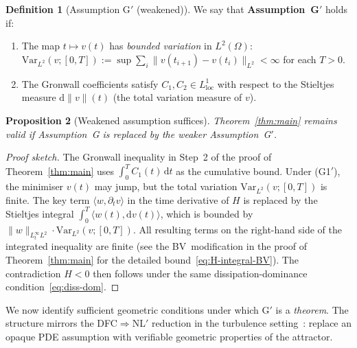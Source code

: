 \documentclass[12pt,a4paper]{article}
\theoremstyle{definition}
\newtheorem{definition}{Definition}[section]
\theoremstyle{plain}
\newtheorem{proposition}[definition]{Proposition}
\theoremstyle{remark}
\begin{document}
\begin{definition}[Assumption G$'$ (weakened)]\label{ass:Gprime}
We say that \textbf{Assumption~G$'$} holds if:
\begin{enumerate}
    \item[\emph{(G1$'$)}] The map $t \mapsto v(t)$ has \emph{bounded variation}
          in $L^2(\Omega)$: $\mathrm{Var}_{L^2}(v; [0,T]) :=
          \sup \sum_{i} \|v(t_{i+1}) - v(t_i)\|_{L^2} < \infty$ for each
          $T > 0$.
    \item[\emph{(G2$'$)}] The Gronwall coefficients satisfy
          $C_1, C_2 \in L^1_{\mathrm{loc}}$ with respect to the Stieltjes
          measure $\mathrm{d}\|v\|(t)$ (the total variation measure of $v$).
\end{enumerate}
\end{definition}

\begin{proposition}[Weakened assumption suffices]\label{prop:Gprime}
Theorem~\ref{thm:main} remains valid if Assumption~G is replaced by the
weaker Assumption~G$'$.
\end{proposition}

\begin{proof}[Proof sketch]
The Gronwall inequality in Step~2 of the proof of
Theorem~\ref{thm:main} uses $\int_0^T C_1(t)\,\mathrm{d} t$ as the cumulative
bound. Under (G1$'$), the minimiser $v(t)$ may jump, but the total
variation $\mathrm{Var}_{L^2}(v;[0,T])$ is finite. The key term
$\langle w, \partial_t v \rangle$ in the time derivative of $H$ is
replaced by the Stieltjes integral $\int_0^T \langle w(t),
\mathrm{d} v(t)\rangle$, which is bounded by $\|w\|_{L^\infty_t L^2}\cdot
\mathrm{Var}_{L^2}(v;[0,T])$. All resulting terms on the right-hand
side of the integrated inequality are finite (see the BV~modification
in the proof of Theorem~\ref{thm:main} for the detailed
bound~\eqref{eq:H-integral-BV}). The contradiction $H < 0$ then
follows under the same dissipation-dominance
condition~\eqref{eq:diss-dom}.
\end{proof}

We now identify sufficient geometric conditions under which G$'$ is a
\emph{theorem}. The structure mirrors the DFC$\Rightarrow$NL$'$
reduction in the turbulence setting~\cite{FST-TU2026}: replace an
opaque PDE assumption with verifiable geometric properties of the
attractor.
\end{document}
